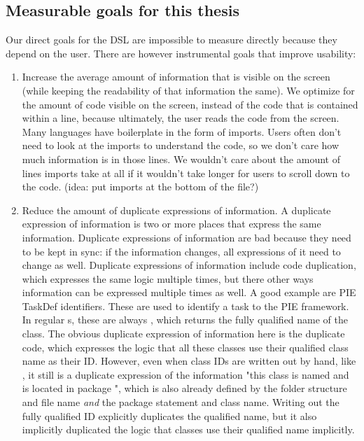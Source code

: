 \subsection{Measurable goals for this thesis}
Our direct goals for the DSL are impossible to measure directly because they depend on the user.
There are however instrumental goals that improve usability:
\begin{enumerate}
  \item Increase the average amount of information that is visible on the screen (while keeping the readability of that information the same).
  We optimize for the amount of code visible on the screen, instead of the code that is contained within a line, because ultimately, the user reads the code from the screen.
  Many languages have boilerplate in the form of imports.
  Users often don't need to look at the imports to understand the code, so we don't care how much information is in those lines.
  We wouldn't care about the amount of lines imports take at all if it wouldn't take longer for users to scroll down to the code.
  (idea: put imports at the bottom of the file?)
  \item Reduce the amount of duplicate expressions of information.
  A duplicate expression of information is two or more places that express the same information.
  Duplicate expressions of information are bad because they need to be kept in sync: if the information changes, all expressions of it need to change as well.
  Duplicate expressions of information include code duplication, which expresses the same logic multiple times, but there other ways information can be expressed multiple times as well.
  A good example are PIE TaskDef identifiers.
  These are used to identify a task to the PIE framework.
  In regular s, these are always , which returns the fully qualified name of the class.
  The obvious duplicate expression of information here is the duplicate code, which expresses the logic that all these classes use their qualified class name as their ID.
  However, even when class IDs are written out by hand, like , it still is a duplicate expression of the information "this class is named  and is located in package ", which is also already defined by the folder structure and file name \emph{and} the package statement and class name.
  Writing out the fully qualified ID explicitly duplicates the qualified name, but it also implicitly duplicated the logic that classes use their qualified name implicitly.

\end{enumerate}
